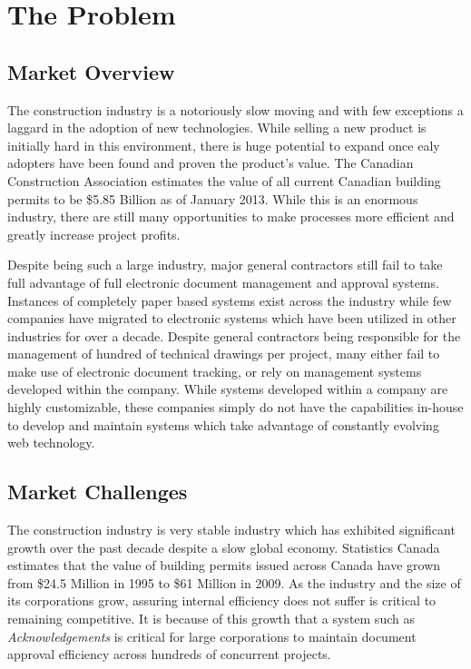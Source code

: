 \section{The Problem}

\subsection{Market Overview}
The construction industry is a notoriously slow moving and with few exceptions a laggard in the adoption of new technologies. While selling a new product is initially hard in this environment, there is huge potential to expand once ealy adopters have been found and proven the product's value. The Canadian Construction Association estimates the value of all current Canadian building permits to be \$5.85 Billion as of January 2013. While this is an enormous industry, there are still many opportunities to make processes more efficient and greatly increase project profits.

Despite being such a large industry, major general contractors still fail to take full advantage of full electronic document management and approval systems. Instances of completely paper based systems exist across the industry while few companies have migrated to electronic systems which have been utilized in other industries for over a decade. Despite general contractors being responsible for the management of hundred of technical drawings per project, many either fail to make use of electronic document tracking, or rely on management systems developed within the company. While systems developed within a company are highly customizable, these companies simply do not have the capabilities in-house to develop and maintain systems which take advantage of constantly evolving web technology.

\subsection{Market Challenges}

The construction industry is very stable industry which has exhibited significant growth over the past decade despite a slow global economy. Statistics Canada estimates that the value of building permits issued across Canada have grown from \$24.5 Million in 1995 to \$61 Million in 2009. As the industry and the size of its corporations grow, assuring internal efficiency does not suffer is critical to remaining competitive. It is because of this growth that a system such as {\it Acknowledgements} is critical for large corporations to maintain document approval efficiency across hundreds of concurrent projects.


